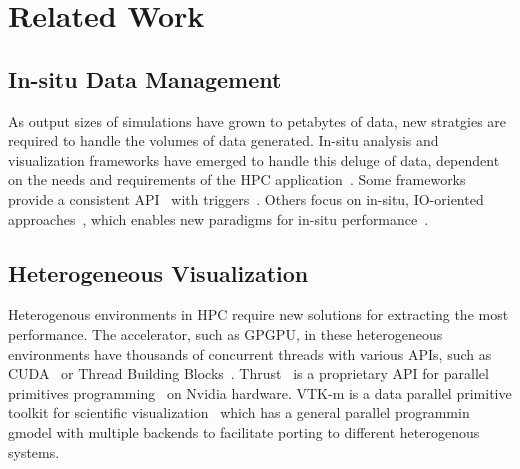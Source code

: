 \documentclass[conference]{IEEEtran}
\begin{document}
\section{Related Work}
\subsection{In-situ Data Management}
As output sizes of simulations have grown to petabytes of data, new stratgies are required to handle the volumes of data generated. In-situ analysis and visualization frameworks have emerged to handle this deluge of data, dependent on the needs and requirements of the HPC application~\cite{Abbasi2010, Ayachit:2015:PCE:2828612.2828624,Childs:VisIt-HPV-Chapter:2012, 6846460}. Some frameworks provide a consistent API~\cite{Ayachit:2016:SGS:3018859.3018867,Larsen:2017:ASI:3144769.3144778} with triggers~\cite{Larsen:2018:FSS:3281464.3281468}. Others focus on in-situ, IO-oriented approaches~\cite{doi:10.1002/cpe.3125}, which enables new paradigms for in-situ performance~\cite{Kress:ISC19}.

\subsection{Heterogeneous Visualization}
Heterogenous environments in HPC require new solutions for extracting the most performance. The accelerator, such as GPGPU, in these heterogeneous environments have thousands of concurrent threads with various APIs, such as CUDA~\cite{CUDA} or Thread Building Blocks~\cite{books:daglib:0018624}. Thrust~\cite{hoberock2009thrust} is a proprietary API for parallel primitives programming~\cite{Blelloch:1990:VMD:91254} on Nvidia hardware. VTK-m is a data parallel primitive toolkit for scientific visualization~\cite{vtkm} which has a general parallel programmin gmodel with multiple backends to facilitate porting to different heterogenous systems. 
\end{document}
